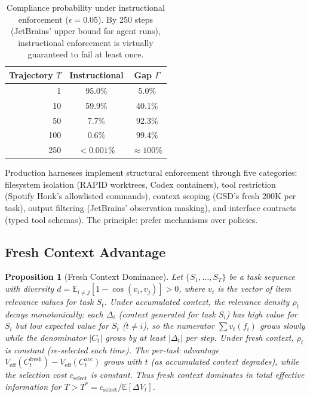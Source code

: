 \documentclass[11pt, a4paper, logo, copyright]{googledeepmind}
\newtheorem{proposition}{Proposition}[section]
\begin{document}
\begin{table}[h]
\centering
\small
\begin{tabular}{rcc}
\toprule
\textbf{Trajectory $T$} & \textbf{Instructional} & \textbf{Gap $\Gamma$} \\
\midrule
1 & 95.0\% & 5.0\% \\
10 & 59.9\% & 40.1\% \\
50 & 7.7\% & 92.3\% \\
100 & 0.6\% & 99.4\% \\
250 & $< 0.001\%$ & $\approx 100\%$ \\
\bottomrule
\end{tabular}
\caption{Compliance probability under instructional enforcement ($\epsilon = 0.05$). By 250 steps (JetBrains' upper bound for agent runs), instructional enforcement is virtually guaranteed to fail at least once.}
\label{tab:compliance}
\end{table}

Production harnesses implement structural enforcement through five categories: filesystem isolation (RAPID worktrees, Codex containers), tool restriction (Spotify Honk's allowlisted commands), context scoping (GSD's fresh 200K per task), output filtering (JetBrains' observation masking), and interface contracts (typed tool schemas). The principle: prefer mechanisms over policies.

\subsection{Fresh Context Advantage}

\begin{proposition}[Fresh Context Dominance]
\label{thm:fresh}
Let $\{S_1, \ldots, S_T\}$ be a task sequence with \emph{diversity} $d = \mathbb{E}_{i \neq j}[1 - \cos(v_i, v_j)] > 0$, where $v_t$ is the vector of item relevance values for task $S_t$. Under accumulated context, the relevance density $\rho_t$ decays monotonically: each $\Delta_i$ (context generated for task $S_i$) has high value for $S_i$ but low expected value for $S_t$ ($t \neq i$), so the numerator $\sum v_t(f_i)$ grows slowly while the denominator $|C_t|$ grows by at least $|\Delta_t|$ per step. Under fresh context, $\rho_t$ is constant (re-selected each time). The per-task advantage $V_{\text{eff}}(C_t^{\text{fresh}}) - V_{\text{eff}}(C_t^{\text{acc}})$ grows with $t$ (as accumulated context degrades), while the selection cost $c_{\text{select}}$ is constant. Thus fresh context dominates in total effective information for $T > T^* = c_{\text{select}} / \mathbb{E}[\Delta V_t]$.
\end{proposition}
\end{document}
